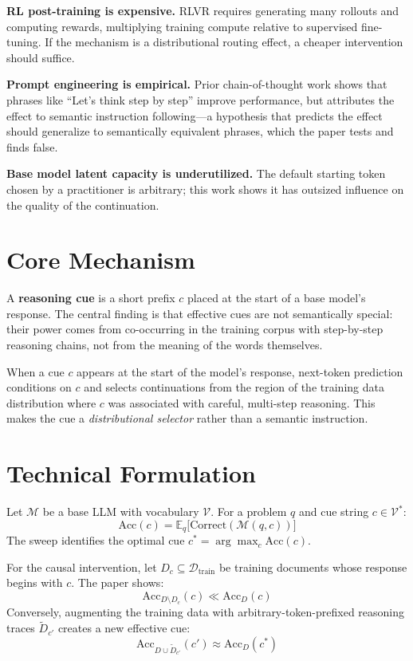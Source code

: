 \documentclass[10pt,twocolumn]{article}
\begin{document}
\textbf{RL post-training is expensive.} RLVR requires generating many rollouts and
computing rewards, multiplying training compute relative to supervised fine-tuning.
If the mechanism is a distributional routing effect, a cheaper intervention should
suffice.

\textbf{Prompt engineering is empirical.} Prior chain-of-thought work shows that
phrases like ``Let's think step by step'' improve performance, but attributes
the effect to semantic instruction following---a hypothesis that predicts the
effect should generalize to semantically equivalent phrases, which the paper tests
and finds false.

\textbf{Base model latent capacity is underutilized.} The default starting token
chosen by a practitioner is arbitrary; this work shows it has outsized influence
on the quality of the continuation.

\section{Core Mechanism}

A \textbf{reasoning cue} is a short prefix $c$ placed at the start of a base model's
response. The central finding is that effective cues are not semantically special:
their power comes from co-occurring in the training corpus with step-by-step
reasoning chains, not from the meaning of the words themselves.

When a cue $c$ appears at the start of the model's response, next-token prediction
conditions on $c$ and selects continuations from the region of the training data
distribution where $c$ was associated with careful, multi-step reasoning.
This makes the cue a \emph{distributional selector} rather than a semantic instruction.

\section{Technical Formulation}

Let $\mathcal{M}$ be a base LLM with vocabulary $\mathcal{V}$. For a problem $q$
and cue string $c \in \mathcal{V}^*$:
\[
\text{Acc}(c) = \mathbb{E}_q\bigl[\text{Correct}(\mathcal{M}(q, c))\bigr]
\]
The sweep identifies the optimal cue $c^* = \arg\max_c \text{Acc}(c)$.

For the causal intervention, let $D_c \subseteq \mathcal{D}_\text{train}$ be
training documents whose response begins with $c$. The paper shows:
\[
\text{Acc}_{D \setminus D_c}(c) \ll \text{Acc}_D(c)
\]
Conversely, augmenting the training data with arbitrary-token-prefixed reasoning
traces $\widetilde{D}_{c'}$ creates a new effective cue:
\[
\text{Acc}_{D \cup \widetilde{D}_{c'}}(c') \approx \text{Acc}_D(c^*)
\]
\end{document}
